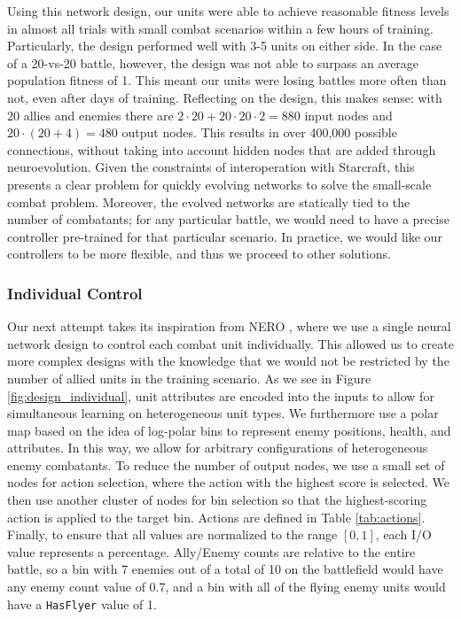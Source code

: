 \documentclass[10pt,a4paper,twocolumn]{article}
\begin{document}
Using this network design, our units were able to achieve reasonable fitness levels in almost all trials with small combat scenarios within a few hours of training. Particularly, the design performed well with 3-5 units on either side. In the case of a 20-vs-20 battle, however, the design was not able to surpass an average population fitness of 1. This meant our units were losing battles more often than not, even after days of training. Reflecting on the design, this makes sense: with 20 allies and enemies there are $2 \cdot 20 + 20\cdot 20 \cdot 2 = 880$ input nodes and $20 \cdot (20 + 4) = 480$ output nodes. This results in over 400,000 possible connections, without taking into account hidden nodes that are added through neuroevolution. Given the constraints of interoperation with Starcraft, this presents a clear problem for quickly evolving networks to solve the small-scale combat problem. Moreover, the evolved networks are statically tied to the number of combatants; for any particular battle, we would need to have a precise controller pre-trained for that particular scenario. In practice, we would like our controllers to be more flexible, and thus we proceed to other solutions.

\subsubsection{Individual Control}
\label{sec:individual_design}

Our next attempt takes its inspiration from NERO \cite{stanley:ieeetec05}, where we use a single neural network design to control each combat unit individually. This allowed us to create more complex designs with the knowledge that we would not be restricted by the number of allied units in the training scenario. As we see in Figure \ref{fig:design_individual}, unit attributes are encoded into the inputs to allow for simultaneous learning on heterogeneous unit types. We furthermore use a polar map based on the idea of log-polar bins to represent enemy positions, health, and attributes. In this way, we allow for arbitrary configurations of heterogeneous enemy combatants. To reduce the number of output nodes, we use a small set of nodes for action selection, where the action with the highest score is selected. We then use another cluster of nodes for bin selection so that the highest-scoring action is applied to the target bin. Actions are defined in Table \ref{tab:actions}. Finally, to ensure that all values are normalized to the range $[0,1]$, each I/O value represents a percentage. Ally/Enemy counts are relative to the entire battle, so a bin with 7 enemies out of a total of 10 on the battlefield would have any enemy count value of 0.7, and a bin with all of the flying enemy units would have a \texttt{HasFlyer} value of 1.
\end{document}
